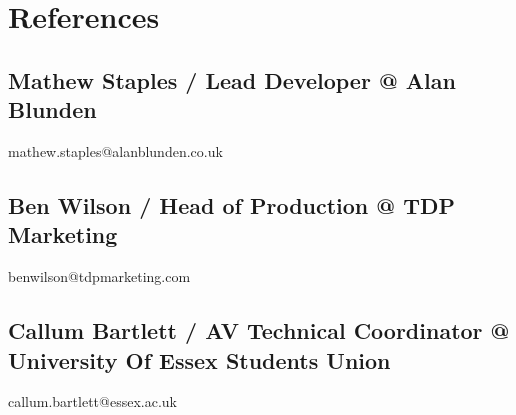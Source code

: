 \documentclass{article}
\begin{document}
\section{References}

\subsection{Mathew Staples / Lead Developer @ Alan Blunden} mathew.staples@alanblunden.co.uk
\subsection{Ben Wilson / Head of Production @ TDP Marketing} benwilson@tdpmarketing.com 
\subsection{Callum Bartlett / AV Technical Coordinator @ University Of Essex Students Union} callum.bartlett@essex.ac.uk

\end{document}
